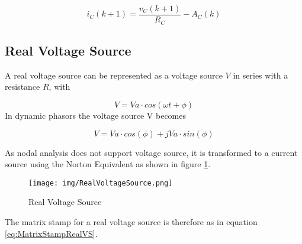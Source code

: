 \begin{equation}
i_C(k+1) = \frac{v_C(k+1)}{R_C} - A_C(k)
\end{equation}
 

\subsection{Real Voltage Source} \label{sub:RealVoltageSource}

A real voltage source can be represented as a voltage source $V$ in series with a resistance $R$, with

\begin{equation}
V=Va \cdot cos(\omega t + \phi)
\end{equation}
In dynamic phasors the voltage source V becomes

\begin{equation}
V = Va \cdot cos (\phi) + jVa \cdot sin(\phi) 
\end{equation}

As nodal analysis does not support voltage source, it is transformed to a current source using the Norton Equivalent as shown in figure \ref{fig:Real_Voltage_Source}.

\begin{figure}[ht]
	\centering
	\texttt{[image: img/RealVoltageSource.png]} 
	\caption{Real Voltage Source}
	\label{fig:Real_Voltage_Source}
\end{figure}

The matrix stamp for a real voltage source is therefore as in equation \ref{eq:MatrixStampRealVS}.

